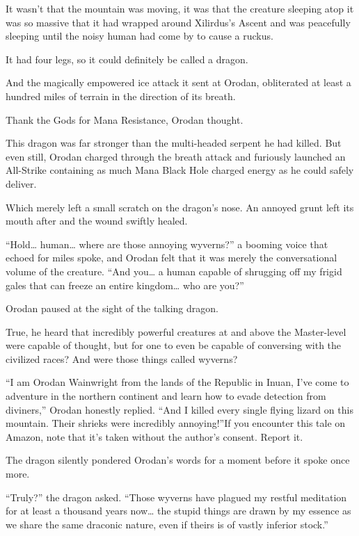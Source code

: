 \documentclass[a4paper,10pt]{book}
\begin{document}
It wasn’t that the mountain was moving, it was that the creature sleeping atop it was so massive that it had wrapped around Xilirdus’s Ascent and was peacefully sleeping until the noisy human had come by to cause a ruckus.\par
It had four legs, so it could definitely be called a dragon.\par
And the magically empowered ice attack it sent at Orodan, obliterated at least a hundred miles of terrain in the direction of its breath.\par
Thank the Gods for Mana Resistance, Orodan thought.\par
This dragon was far stronger than the multi-headed serpent he had killed. But even still, Orodan charged through the breath attack and furiously launched an All-Strike containing as much Mana Black Hole charged energy as he could safely deliver.\par
Which merely left a small scratch on the dragon’s nose. An annoyed grunt left its mouth after and the wound swiftly healed.\par
“Hold… human… where are those annoying wyverns?” a booming voice that echoed for miles spoke, and Orodan felt that it was merely the conversational volume of the creature. “And you… a human capable of shrugging off my frigid gales that can freeze an entire kingdom… who are you?”\par
Orodan paused at the sight of the talking dragon.\par
True, he heard that incredibly powerful creatures at and above the Master-level were capable of thought, but for one to even be capable of conversing with the civilized races? And were those things called wyverns?\par
“I am Orodan Wainwright from the lands of the Republic in Inuan, I’ve come to adventure in the northern continent and learn how to evade detection from diviners,” Orodan honestly replied. “And I killed every single flying lizard on this mountain. Their shrieks were incredibly annoying!”If you encounter this tale on Amazon, note that it's taken without the author's consent. Report it.\par
The dragon silently pondered Orodan’s words for a moment before it spoke once more.\par
“Truly?” the dragon asked. “Those wyverns have plagued my restful meditation for at least a thousand years now… the stupid things are drawn by my essence as we share the same draconic nature, even if theirs is of vastly inferior stock.”\par
\end{document}
